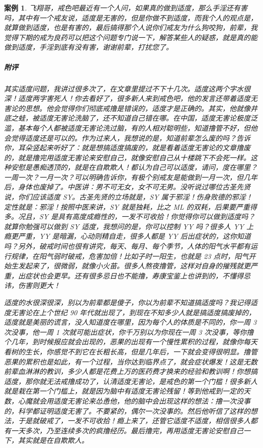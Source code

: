 \documentclass{ctexart}
\newtheorem{case}{案例}
\begin{document}
\begin{case}
    飞翔哥，戒色吧最近有一个人问，如果真的做到适度，那么手淫还有害吗，其中有一个戒友说，适度是无害的，但是你做不到适度，而我个人的观点是，就算做到适度，也是有害的，最后搞得那个人说你们戒友为什么狗咬狗，前辈，我觉得下期的戒为良药可以把这个问题专门说一下，解答某些人的疑惑，就是真的能做到适度，手淫到底有没有害，谢谢前辈，打扰您了。
    \subparagraph{附评} 其实适度问题，我讲过很多次了，在文章里提过不下十几次。适度这两个字水很深！适度两字害死人！你去看好了，很多新人来到戒色吧，他的发言还带着适度无害论的思想。他会觉得你们彻底戒撸是错误的，适度才是正确的。其实，他就像井底之蛙，被适度无害论洗脑了，还不知道自己错在哪。在中国，适度无害论极度泛滥，基本每个人都被适度无害论洗过脑，有的人相对聪明些，知道撸管不好，但他会觉得适度还是可以的。作为过来人，我想说的是，知道前辈怎么废的吗？告诉你，耳朵竖起来听好了：就是想搞适度搞废的，就是看着适度无害论的文章撸废的，就是撸完用适度无害论来安慰自己，就像安慰自己从十楼跳下不会死一样。这种安慰是愚痴透顶的，就是在自欺欺人！都认为自己可以适度，请问，度在哪里？一周一次？一月一次？可以明确告诉你，有极个别戒友是能做到一月一次，但几年后，身体也废掉了。中医讲：男不可无女，女不可无男。没听说过哪位古圣先贤说，你们应该适度 SY。古圣先贤的立场就是，SY 属于邪淫！伤身败德的邪淫！定性就是：邪淫！按照中医来讲，SY 就是独耗，比之 ML 的双耗，后果要严重得多。况且，SY 是具有高度成瘾性的，一发不可收拾！你觉得你可以做到适度吗？就算你勉强可以做到 SY 适度，我想问的是，你可以控制 YY 吗？很多人 YY 上瘾更严重，YY 是暗漏，心动则精自走，很多人都是 YY 后出症状的，这你知道吗？另外，破戒时间也很有讲究，每天、每月、每个季节，人体的阳气水平都有运行规律，在阳气弱时破戒，危害加倍！比如子时一阳生，也就是 23 点时，阳气开始生发起来了，很微弱，就像小火苗。很多人熬夜撸管，这样对自身的摧残就更严重，出症状也会更早。还有很多忌日也不能撸，寿康宝鉴上也讲到的，不懂得忌讳，伤害则更大！

    适度的水很深很深，别以为前辈都是傻子，你以为前辈不知道搞适度吗？我记得适度无害论在上个世纪 90 年代就出现了，到现在不知多少人就是搞适度搞废掉的，适度就是美丽的谎言，没人知道度在哪里，因为每个人的体质是不同的，你一周 3 次没事，他一周 1 次就可能出症状，你千万别以为你现在一周 3 次没事，等你撸个几年，到时候报应就会出现的，恶果的出现有一个慢性累积的过程，就像你每天看树的生长，你感觉不到它在长粗长高，但是几年后，一下就会变得很明显。撸管恶果的累积也是如此，有一个过程，当你达到临界点了，就会症状爆发！这是无数前辈血淋淋的教训，多少人都是花费上万的医药费才换来的经验和教训啊！你想搞适度，那你就无法戒撸成功了，认清适度无害论，是戒色的第一个门槛！很多新人就是栽在第一个门槛上，就是因为脑中有适度无害论残留！等到他戒到一定的天数，心魔就会用适度无害论来怂恿他，他的脑中会出现这样的想法：撸一次没事的，科学都证明适度无害了。不要紧的，偶尔一次没事的。然后他听信了这样的想法，于是就破戒了，一发不可收拾！瘾上来了，还管它适度不适度，相信很多人都有一天多次，乃至连续多次的疯撸经历。最后撸完，再用适度无害论安慰自己一下，其实就是在自欺欺人。


\end{case}
\end{document}
